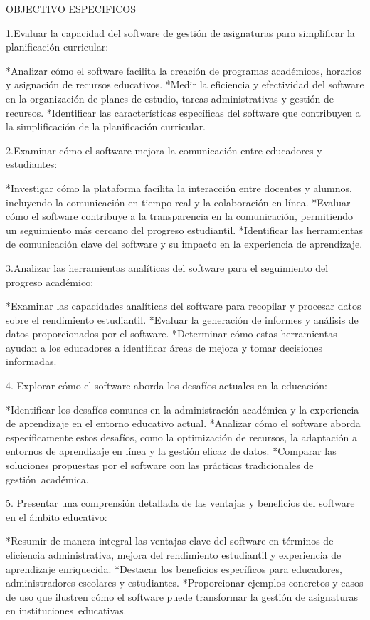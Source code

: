 OBJECTIVO ESPECIFICOS 

1.Evaluar la capacidad del software de gestión de asignaturas para simplificar la planificación curricular:

*Analizar cómo el software facilita la creación de programas académicos, horarios y asignación de recursos educativos.
*Medir la eficiencia y efectividad del software en la organización de planes de estudio, tareas administrativas y gestión de recursos.
*Identificar las características específicas del software que contribuyen a la simplificación de la planificación curricular.

2.Examinar cómo el software mejora la comunicación entre educadores y estudiantes:

*Investigar cómo la plataforma facilita la interacción entre docentes y alumnos, incluyendo la comunicación en tiempo real y la colaboración en línea.
*Evaluar cómo el software contribuye a la transparencia en la comunicación, permitiendo un seguimiento más cercano del progreso estudiantil.
*Identificar las herramientas de comunicación clave del software y su impacto en la experiencia de aprendizaje.

3.Analizar las herramientas analíticas del software para el seguimiento del progreso académico:

*Examinar las capacidades analíticas del software para recopilar y procesar datos sobre el rendimiento estudiantil.
*Evaluar la generación de informes y análisis de datos proporcionados por el software.
*Determinar cómo estas herramientas ayudan a los educadores a identificar áreas de mejora y tomar decisiones informadas.

4. Explorar cómo el software aborda los desafíos actuales en la educación:

*Identificar los desafíos comunes en la administración académica y la experiencia de aprendizaje en el entorno educativo actual.
*Analizar cómo el software aborda específicamente estos desafíos, como la optimización de recursos, la adaptación a entornos de
aprendizaje en línea y la gestión eficaz de datos.
*Comparar las soluciones propuestas por el software con las prácticas tradicionales de gestión académica.

5. Presentar una comprensión detallada de las ventajas y beneficios del software en el ámbito educativo:

*Resumir de manera integral las ventajas clave del software en términos de eficiencia administrativa, mejora del rendimiento estudiantil
y experiencia de aprendizaje enriquecida.
*Destacar los beneficios específicos para educadores, administradores escolares y estudiantes.
*Proporcionar ejemplos concretos y casos de uso que ilustren cómo el software puede transformar la gestión de asignaturas en
instituciones educativas.

